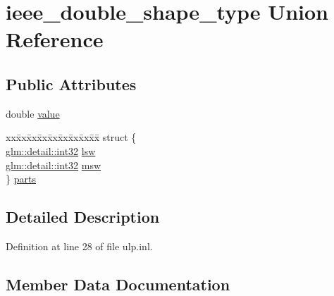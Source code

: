 \hypertarget{unionieee__double__shape__type}{}\section{ieee\+\_\+double\+\_\+shape\+\_\+type Union Reference}
\label{unionieee__double__shape__type}
\subsection*{Public Attributes}
\begin{DoxyCompactItemize}
\item 
double \mbox{\hyperlink{unionieee__double__shape__type_a2d9c4cab9e3fa74e4be6d72f798a145b}{value}}
\item 
\begin{tabbing}
xx\=xx\=xx\=xx\=xx\=xx\=xx\=xx\=xx\=\kill
struct \{\\
\>\mbox{\hyperlink{namespaceglm_1_1detail_a9f85b4efeca416cdcec2fd08939a2e17}{glm::detail::int32}} \mbox{\hyperlink{unionieee__double__shape__type_a15dfdc2d74a323f6638204624834f101}{lsw}}\\
\>\mbox{\hyperlink{namespaceglm_1_1detail_a9f85b4efeca416cdcec2fd08939a2e17}{glm::detail::int32}} \mbox{\hyperlink{unionieee__double__shape__type_aea1156759f6afd58a56a7b4e7bfcee01}{msw}}\\
\} \mbox{\hyperlink{unionieee__double__shape__type_af07d7842d3604ba30304c8a17bdfa3ff}{parts}}\\

\end{tabbing}\end{DoxyCompactItemize}


\subsection{Detailed Description}


Definition at line 28 of file ulp.\+inl.



\subsection{Member Data Documentation}
\mbox{\label{unionieee__double__shape__type_a15dfdc2d74a323f6638204624834f101}} 
